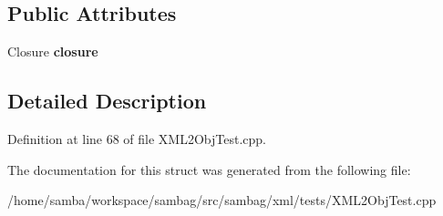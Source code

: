 \subsection*{Public Attributes}
\begin{DoxyCompactItemize}
\item 
\hypertarget{struct_root_a0a409c75e0b74b81315afb319b8b63e4}{
Closure {\bfseries closure}}
\label{struct_root_a0a409c75e0b74b81315afb319b8b63e4}

\end{DoxyCompactItemize}


\subsection{Detailed Description}


Definition at line 68 of file XML2ObjTest.cpp.



The documentation for this struct was generated from the following file:\begin{DoxyCompactItemize}
\item 
/home/samba/workspace/sambag/src/sambag/xml/tests/XML2ObjTest.cpp\end{DoxyCompactItemize}
